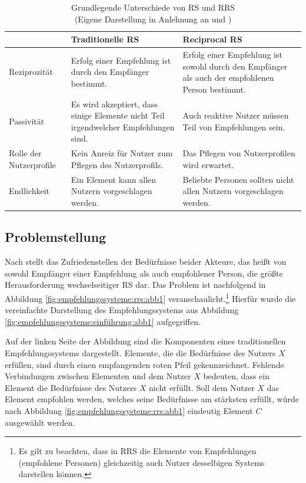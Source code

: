 \begin{table}[htbp]
    \begin{center}
        \begin{tabular}{p{}|p{}|p{}}
             & {\textbf{Traditionelle RS}} & {\textbf{Reciprocal RS}} \\
            \hline
            Reziprozität & Erfolg einer Empfehlung ist durch den Empfänger bestimmt. &  Erfolg einer Empfehlung ist sowohl durch den Empfänger als auch der empfohlenen Person bestimmt. \\
            \hline
            Passivität & Es wird akzeptiert, dass einige Elemente nicht Teil irgendwelcher Empfehlungen sind. &  Auch reaktive Nutzer müssen Teil von Empfehlungen sein. \\
            \hline
            Rolle der Nutzerprofile & Kein Anreiz für Nutzer zum Pflegen des Nutzerprofils. &  Das Pflegen von Nutzerprofilen wird erwartet. \\
            \hline
            Endlichkeit & Ein Element kann allen Nutzern vorgeschlagen werden. & Beliebte Personen sollten nicht allen Nutzern vorgeschlagen werden. \\
    \end{tabular}
    \end{center}
    \caption[Grundlegende Unterschiede von RS und RRS]{Grundlegende Unterschiede von RS und RRS \\
	(Eigene Darstellung in Anlehnung an \cite[S. 546]{koprinska:inbook} und \cite[S. 35f.]{li:inproceedings})}
	\label{tab2}
\end{table}

\subsection{Problemstellung}
Nach \textcite[S. 35]{li:inproceedings} stellt das Zufriedenstellen der Bedürfnisse beider Akteure, das heißt von sowohl Empfänger einer Empfehlung als auch empfohlener Person, die größte Herausforderung wechselseitiger RS dar.
Das Problem ist nachfolgend in Abbildung \ref{fig:empfehlungssysteme:rrs:abb1} veranschaulicht.\footnote{Es gilt zu beachten, dass in RRS die Elemente von Empfehlungen (empfohlene Personen) gleichzeitig auch Nutzer desselbigen Systems darstellen können.}
Hierfür wurde die vereinfachte Darstellung des Empfehlungssystems aus Abbildung \ref{fig:empfehlungssysteme:einführung:abb1} aufgegriffen.

Auf der linken Seite der Abbildung sind die Komponenten eines traditionellen Empfehlungssystems dargestellt.
Elemente, die die Bedürfnisse des Nutzers $X$ erfüllen, sind durch einen empfangenden roten Pfeil gekennzeichnet.
Fehlende Verbindungen zwischen Elementen und dem Nutzer $X$ bedeuten, dass ein Element die Bedürfnisse des Nutzers $X$ nicht erfüllt.
Soll dem Nutzer $X$ das Element empfohlen werden, welches seine Bedürfnisse am stärksten erfüllt, würde nach Abbildung \ref{fig:empfehlungssysteme:rrs:abb1} eindeutig Element $C$ ausgewählt werden.

